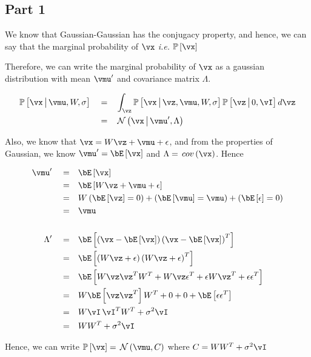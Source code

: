 \documentclass{article}
\begin{document}
\begin{mlsolution}

	\subsection*{Part 1}
	\begin{addmargin}{1.5em}

		We know that Gaussian-Gaussian has the conjugacy property, and hence, we can say that the marginal probability of $\vx$ \textit{i.e.} $\prob{\vx}$ \br%

		Therefore, we can write the marginal probability of $\vx$ as a gaussian distribution with mean $\pr{\vmu}$ and covariance matrix $\Lambda$.

		\begin{align*}
			\prob{\vx \pipe \vmu, W, \sigma}	\eq&	\int_{\vz} \prob{\vx \pipe \vz, \vmu, W, \sigma} \prob{\vz \pipe 0, \iden} d\vz \\
												\eq&	\ND{\vx \pipe \pr{\vmu}, \Lambda}
		\end{align*}

		Also, we know that $\vx = W\vz + \vmu + \eps$, and from the properties of Gaussian, we know $\pr{\vmu} = \E{\vx}$ and $\Lambda = \func{cov}{\vx}$. Hence

		\begin{align*}
			\pr{\vmu}		\eq&	\E{\vx} \\
							\eq&	\E{W\vz + \vmu + \eps} \\
							\eq&	W\para{\E{\vz} = 0} + \para{\E{\vmu} = \vmu} + \para{\E{\eps} = 0} \\
							\eq&	\vmu \\
			\\
			\pr{\Lambda}	\eq&	\E{\para{\vx - \E{\vx}} \para{\vx - \E{\vx}}^T} \\
							\eq&	\E{\para{W \vz + \eps} \para{W \vz + \eps}^T} \\
							\eq&	\E{W \vz \vz^T W^T + W \vz \eps^T + \eps W \vz^T + \eps \eps^T} \\
							\eq&	W \E{\vz \vz^T} W^T + 0 + 0 + \E{\eps \eps^T} \\
							\eq&	W \iden \, \iden^T W^T + \sigma^2 \iden \\
							\eq&	W W^T + \sigma^2 \iden
		\end{align*}

		Hence, we can write $\prob{\vx} = \ND{\vmu, C}$ where $C = W W^T + \sigma^2 \iden$

	\end{addmargin}


\end{mlsolution}
\end{document}
